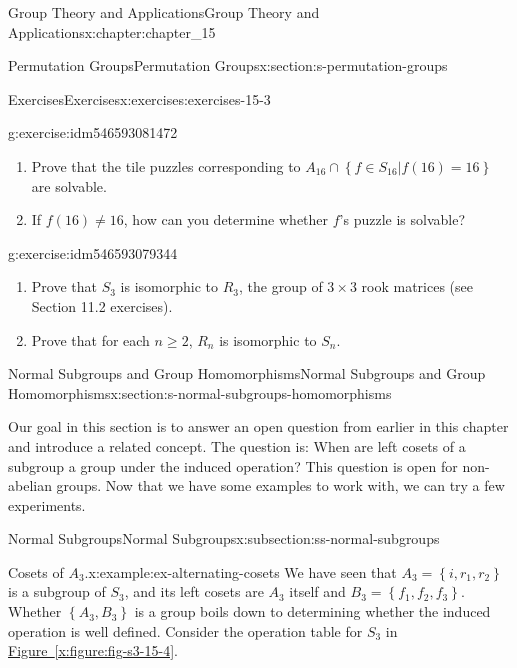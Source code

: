 \documentclass[oneside,10pt,]{book}
\newcommand{\xreffont}{\relax}
\numberwithin{equation}{section}
\begin{document}
\begin{chapterptx}{Group Theory and Applications}{}{Group Theory and Applications}{}{}{x:chapter:chapter_15}
\begin{sectionptx}{Permutation Groups}{}{Permutation Groups}{}{}{x:section:s-permutation-groups}
\begin{exercises-subsection}{Exercises}{}{Exercises}{}{}{x:exercises:exercises-15-3}
\begin{divisionexercise}{12}{}{}{g:exercise:idm546593081472}
\begin{enumerate}[label=(\alph*)]
\item{}Prove that the tile puzzles corresponding to \(A_{16}\cap  \left\{ \left.f \in S_{16} \right| f(16) = 16\right\}\) are solvable.%
\item{}If  \(f(16)\neq  16\), how can you determine whether  \(f\)'s puzzle is solvable?%
\end{enumerate}
%
\end{divisionexercise}%
\begin{divisionexercise}{13}{}{}{g:exercise:idm546593079344}%
%
\begin{enumerate}[label=(\alph*)]
\item{}Prove that \(S_3\) is isomorphic to \(R_3\),  the group of \(3 \times 3\) rook matrices (see Section 11.2 exercises).%
\item{}Prove that for each \(n \geq  2\), \(R_n\) is isomorphic to \(S_n\).%
\end{enumerate}
%
\end{divisionexercise}%
\end{exercises-subsection}
\end{sectionptx}
%
%
\typeout{************************************************}
\typeout{************************************************}
%
\begin{sectionptx}{Normal Subgroups and Group Homomorphisms}{}{Normal Subgroups and Group Homomorphisms}{}{}{x:section:s-normal-subgroups-homomorphisms}
%
%
\begin{introduction}{}%
Our goal in this section is to answer an open question from earlier in this chapter and introduce a related concept. The question is: When are left cosets of a subgroup a group under the induced operation? This question is open for non-abelian groups. Now that we have some examples to work with, we can try a few experiments.%
\end{introduction}%
%
%
\typeout{************************************************}
\typeout{************************************************}
%
\begin{subsectionptx}{Normal Subgroups}{}{Normal Subgroups}{}{}{x:subsection:ss-normal-subgroups}
%
\begin{example}{Cosets of \(A_3\).}{x:example:ex-alternating-cosets}%
We have seen that \(A_3= \left\{i,r_1,r_2\right\}\) is a subgroup of \(S_3\), and its left cosets are \(A_3\) itself and \(B_3=\left\{f_1,f_2,f_3\right\}\). Whether \(\left\{A_3 , B_3 \right\}\) is a group boils down to determining whether the induced operation is well defined.   Consider the operation  table for \(S_3\) in \hyperref[x:figure:fig-s3-15-4]{Figure~{\xreffont\ref{x:figure:fig-s3-15-4}}}.%

\end{example}
\end{subsectionptx}
\end{sectionptx}
\end{chapterptx}
\end{document}
